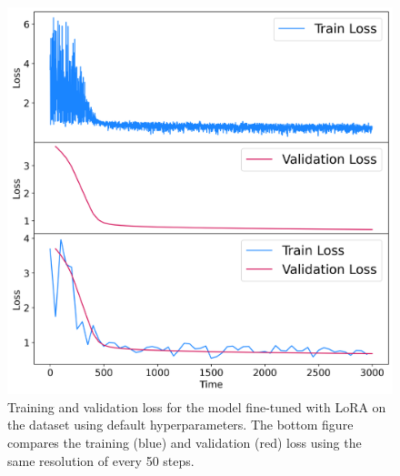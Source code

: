 \documentclass[11pt,a4paper]{article}
\begin{document}
\begin{figure}[h]
    \centering
    \includegraphics[width=\columnwidth, keepaspectratio]{../plots/lora_default_loss.png}
    \caption{Training and validation loss for the model fine-tuned with LoRA on the dataset using default hyperparameters. The bottom figure compares the training (blue) and validation (red) loss using the same resolution of every 50 steps.}
    \label{fig:lora_default_loss}
\end{figure}
\end{document}

